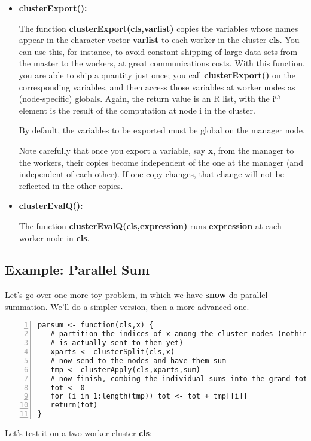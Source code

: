 \begin{itemize}
\item {\bf clusterExport():}

The function {\bf clusterExport(cls,varlist)} copies the variables whose
names appear in the character vector {\bf varlist} to each worker in the
cluster {\bf cls}.  You can use this, for instance, to avoid constant
shipping of large data sets from the master to the workers, at great
communications costs.  With this function, you are able to ship a
quantity just once; you call {\bf clusterExport()} on the corresponding
variables, and then access those variables at worker nodes as
(node-specific) globals.  Again, the return value is an R list, with the
i$^{th}$ element is the result of the computation at node i in the
cluster.

By default, the variables to be exported must be global on the manager
node.

Note carefully that once you export a variable, say {\bf x}, from the
manager to the workers, their copies become independent of the one at
the manager (and independent of each other).  If one copy changes, that
change will not be reflected in the other copies.

\item {\bf clusterEvalQ():}

The function {\bf clusterEvalQ(cls,expression)} runs {\bf
expression} at each worker node in {\bf cls}.

\end{itemize}

\subsection{Example:  Parallel Sum}

Let's go over one more toy problem, in which we have {\bf snow} do
parallel summation.  We'll do a simpler version, then a more advanced
one.

\begin{lstlisting}[numbers=left]
parsum <- function(cls,x) {
   # partition the indices of x among the cluster nodes (nothing
   # is actually sent to them yet)
   xparts <- clusterSplit(cls,x)
   # now send to the nodes and have them sum
   tmp <- clusterApply(cls,xparts,sum)
   # now finish, combing the individual sums into the grand total
   tot <- 0
   for (i in 1:length(tmp)) tot <- tot + tmp[[i]]
   return(tot)
}
\end{lstlisting}

Let's test it on a two-worker cluster {\bf cls}:

